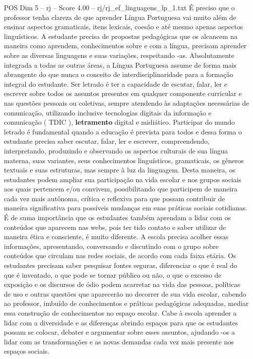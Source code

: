 \begin{textsample}{POS Dim 5 – rj – Score 4.00 – rj/rj\_ef\_linguagens\_lp\_1.txt}
É preciso que o professor tenha clareza de que aprender Língua Portuguesa vai muito além de ensinar aspectos gramaticais, itens lexicais, coesão e até mesmo apenas aspectos linguísticos.
A estudante precisa de propostas pedagógicas que os alcancem na maneira como aprendem, conhecimentos sobre e com a língua, precisam aprender sobre as diversas linguagens e suas variações, respeitando -as.
Absolutamente integrada a todas as outras áreas, a Língua Portuguesa assume de forma mais abrangente do que nunca o conceito de interdisciplinaridade para a formação integral do estudante.
Ser letrado é ter a capacidade de escutar, falar, ler e escrever sobre todos os assuntos presentes em qualquer componente curricular e nas questões pessoais ou coletivas, sempre atendendo às adaptações necessárias de comunicação, utilizando inclusive tecnologias digitais da informação e comunicação ( TDIC ), \textbf{letramento} digital e midiático.
Participar do mundo letrado é fundamental quando a educação é prevista para todos e dessa forma o estudante precisa saber escutar, falar, ler e escrever, compreendendo, interpretando, produzindo e observando os aspectos culturais de sua língua materna, suas variantes, seus conhecimentos linguísticos, gramaticais, os gêneros textuais e suas estruturas, mas sempre à luz da linguagem.
Desta maneira, os estudantes podem ampliar sua participação na vida escolar e nos grupos sociais aos quais pertencem e/ou convivem, possibilitando que participem de maneira cada vez mais autônoma, crítica e reflexiva para que possam contribuir de maneira significativa para possíveis mudanças em suas práticas sociais cotidianas.
É de suma importância que os estudantes também aprendam a lidar com os conteúdos que aparecem nas webs, pois ter tido contato e saber utilizar de maneira ética e consciente, é muito diferente.
A escola precisa acolher essas informações, apresentando, conversando e discutindo com o grupo sobre conteúdos que circulam nas redes sociais, de acordo com cada faixa etária.
Os estudantes precisam saber pesquisar fontes seguras, diferenciar o que é real do que é inventado, o que pode se tornar público ou não, o que o excesso de exposição e os discursos de ódio podem acarretar na vida das pessoas, políticas de uso e outras questões que aparecerão no decorrer de sua vida escolar, cabendo ao professor, imbuído de conhecimentos e práticas pedagógicas adequadas, mediar essa construção de conhecimentos no espaço escolar.
Cabe à escola aprender a lidar com a diversidade e as diferenças abrindo espaços para que os estudantes possam se colocar, debater e argumentar sobre esses assuntos, ajudando -os a lidar com as transformações e as novas demandas cada vez mais presente nos espaços sociais.

\end{textsample}
